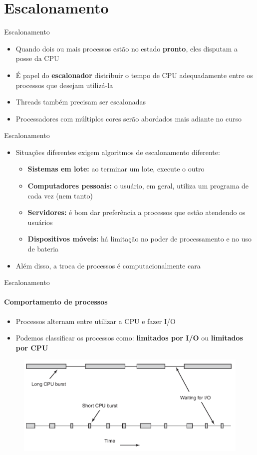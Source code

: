 \documentclass{beamer}
\begin{document}
\section{Escalonamento}
\begin{frame}{Escalonamento}
	\begin{itemize}
		\item Quando dois ou mais processos estão no estado \textbf{pronto}, eles disputam a posse da CPU
		\item É papel do \textbf{escalonador} distribuir o tempo de CPU adequadamente entre os processos que desejam utilizá-la
		\item Threads também precisam ser escalonadas
		\item Processadores com múltiplos cores serão abordados mais adiante no curso
	\end{itemize}
\end{frame}
\begin{frame}{Escalonamento}
	\begin{itemize}
		\item Situações diferentes exigem algoritmos de escalonamento diferente:
		\begin{itemize}
			\item \textbf{Sistemas em lote:} ao terminar um lote, execute o outro
			\item \textbf{Computadores pessoais:} o usuário, em geral, utiliza um programa de cada vez (nem tanto)
			\item \textbf{Servidores:} é bom dar preferência a processos que estão atendendo os usuários
			\item \textbf{Dispositivos móveis:} há limitação no poder de processamento e no uso de bateria
		\end{itemize}
		\item Além disso, a troca de processos é computacionalmente cara
	\end{itemize}
\end{frame}
\begin{frame}{Escalonamento}
	\framesubtitle{Comportamento de processos}
	\begin{itemize}
		\item Processos alternam entre utilizar a CPU e fazer I/O
		\item Podemos classificar os processos como: \textbf{limitados por I/O} ou \textbf{limitados por CPU}
	\end{itemize}
	\begin{figure}
		\includegraphics[width=0.8\paperwidth]{resources/iocpubound}
	\end{figure}
\end{frame}
\end{document}

